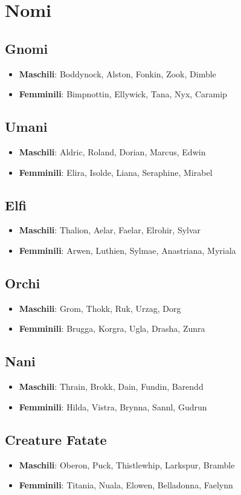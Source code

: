 \section{Nomi}
\subsection*{Gnomi}
\begin{itemize}
  \item \textbf{Maschili}: Boddynock, Alston, Fonkin, Zook, Dimble
  \item \textbf{Femminili}: Bimpnottin, Ellywick, Tana, Nyx, Caramip
\end{itemize}

\subsection*{Umani}
\begin{itemize}
  \item \textbf{Maschili}: Aldric, Roland, Dorian, Marcus, Edwin
  \item \textbf{Femminili}: Elira, Isolde, Liana, Seraphine, Mirabel
\end{itemize}

\subsection*{Elfi}
\begin{itemize}
  \item \textbf{Maschili}: Thalion, Aelar, Faelar, Elrohir, Sylvar
  \item \textbf{Femminili}: Arwen, Luthien, Sylmae, Anastriana, Myriala
\end{itemize}

\subsection*{Orchi}
\begin{itemize}
  \item \textbf{Maschili}: Grom, Thokk, Ruk, Urzag, Dorg
  \item \textbf{Femminili}: Brugga, Korgra, Ugla, Drasha, Zunra
\end{itemize}

\subsection*{Nani}
\begin{itemize}
  \item \textbf{Maschili}: Thrain, Brokk, Dain, Fundin, Barendd
  \item \textbf{Femminili}: Hilda, Vistra, Brynna, Sannl, Gudrun
\end{itemize}

\subsection*{Creature Fatate}
\begin{itemize}
  \item \textbf{Maschili}: Oberon, Puck, Thistlewhip, Larkspur, Bramble
  \item \textbf{Femminili}: Titania, Nuala, Elowen, Belladonna, Faelynn
\end{itemize}
